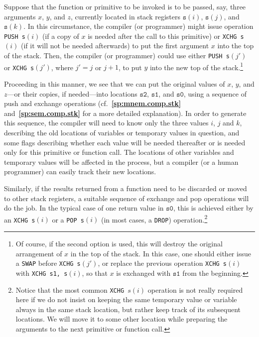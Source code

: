 \documentclass[12pt,oneside]{article}
\def\refpoint#1{{\rm\textbf{\ref{#1}}}}
\let\ptref=\refpoint
\begin{document}
Suppose that the function or primitive to be invoked is to be passed, say, three arguments $x$, $y$, and $z$, currently located in stack registers $\texttt{s}(i)$, $\texttt{s}(j)$, and $\texttt{s}(k)$. In this circumstance, the compiler (or programmer) might issue operation \texttt{PUSH s$(i)$} (if a copy of $x$ is needed after the call to this primitive) or \texttt{XCHG s$(i)$} (if it will not be needed afterwards) to put the first argument $x$ into the top of the stack. Then, the compiler (or programmer) could use either \texttt{PUSH s$(j')$} or \texttt{XCHG s$(j')$}, where $j'=j$ or $j+1$, to put $y$ into the new top of the stack.\footnote{Of course, if the second option is used, this will destroy the original arrangement of $x$ in the top of the stack. In this case, one should either issue a \texttt{SWAP} before \texttt{XCHG s$(j')$}, or replace the previous operation \texttt{XCHG s$(i)$} with \texttt{XCHG s1, s$(i)$}, so that $x$ is exchanged with $\texttt{s1}$ from the beginning.}

 Proceeding in this manner, we see that we can put the original values of $x$, $y$, and $z$---or their copies, if needed---into locations $\texttt{s2}$, $\texttt{s1}$, and $\texttt{s0}$, using a sequence of push and exchange operations (cf.~\ptref{sp:mnem.comp.stk} and~\ptref{sp:sem.comp.stk} for a more detailed explanation). In order to generate this sequence, the compiler will need to know only the three values $i$, $j$ and $k$, describing the old locations of variables or temporary values in question, and some flags describing whether each value will be needed thereafter or is needed only for this primitive or function call. The locations of other variables and temporary values will be affected in the process, but a compiler (or a human programmer) can easily track their new locations.

Similarly, if the results returned from a function need to be discarded or moved to other stack registers, a suitable sequence of exchange and pop operations will do the job. In the typical case of one return value in $\texttt{s0}$, this is achieved either by an \texttt{XCHG s$(i)$} or a \texttt{POP s$(i)$} (in most cases, a \texttt{DROP}) operation.\footnote{Notice that the most common \texttt{XCHG $s(i)$} operation is not really required here if we do not insist on keeping the same temporary value or variable always in the same stack location, but rather keep track of its subsequent locations. We will move it to some other location while preparing the arguments to the next primitive or function call.}
\end{document}
